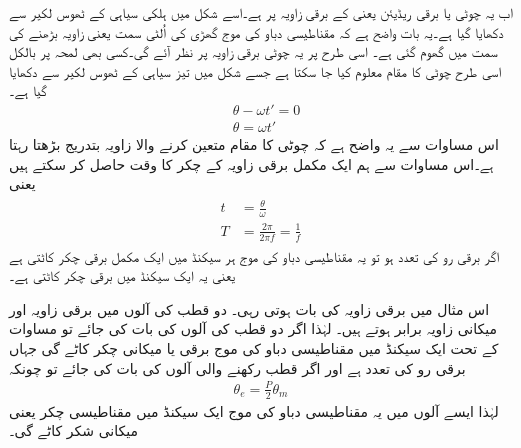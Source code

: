 اب یہ چوٹی  یا  برقی ریڈیئن یعنی  کے برقی زاویہ پر ہے۔اسے  شکل میں ہلکی سیاہی کے ٹھوس لکیر سے دکھایا گیا ہے۔یہ بات واضح ہے کہ مقناطیسی دباو کی موج گھڑی کی اُلٹی سمت یعنی زاویہ بڑھنے کی سمت میں گھوم گئی ہے۔ اسی طرح   پر یہ چوٹی  برقی زاویہ پر نظر آئے گی۔کسی بھی لمحہ  پر بالکل اسی طرح چوٹی کا مقام معلوم کیا جا سکتا ہے جسے شکل میں تیز سیاہی کے ٹھوس لکیر سے دکھایا گیا ہے۔
\begin{align*}
&\theta-\omega t' =0\\
&\theta =\omega t'
\end{align*}
اس مساوات سے یہ واضح ہے کہ چوٹی کا مقام متعین کرنے والا زاویہ بتدریج بڑھتا رہتا ہے۔اس مساوات سے ہم ایک مکمل  برقی زاویہ کے چکر کا وقت  حاصل کر سکتے ہیں یعنی
\begin{gather}
\begin{aligned}\label{مساوات_گھومتے_مشین_دوری_وقفہ}
t&=\frac{\theta}{\omega}\\
T&=\frac{2\pi}{2\pi f}=\frac{1}{f}
\end{aligned}
\end{gather}
اگر برقی رو کی تعدد  ہو تو یہ مقناطیسی دباو کی موج ہر  سیکنڈ میں ایک مکمل برقی چکر کاٹتی ہے یعنی یہ ایک سیکنڈ میں  برقی چکر کاٹتی ہے۔

اس مثال میں برقی زاویہ کی بات ہوتی رہی۔ دو قطب کی آلوں میں برقی زاویہ   اور میکانی زاویہ  برابر ہوتے ہیں۔ لہٰذا اگر دو قطب کی آلوں کی بات کی جائے تو مساوات   کے تحت ایک سیکنڈ میں مقناطیسی دباو کی موج  برقی یا میکانی چکر کاٹے گی جہاں  برقی رو کی تعدد ہے اور اگر  قطب رکھنے والی آلوں کی بات کی جائے تو چونکہ
\begin{align}
\theta_e=\frac{P}{2} \theta_m
\end{align}
لہٰذا ایسے آلوں میں یہ مقناطیسی دباو کی موج ایک سیکنڈ میں  مقناطیسی چکر یعنی  میکانی شکر کاٹے گی۔

